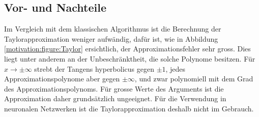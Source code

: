 \subsection{Vor- und Nachteile}
Im Vergleich mit dem klassischen Algorithmus ist die Berechnung der
Taylorapproximation weniger aufwändig, dafür ist, wie in Abbildung
\ref{motivation:figure:Taylor} ersichtlich, der Approximationsfehler
sehr gross. Dies liegt unter anderem an der Unbeschränktheit, die
solche Polynome besitzen.
Für $x\to\pm\infty$ strebt der Tangens hyperbolicus gegen $\pm 1$,
jedes Approximationspolynome aber gegen $\pm\infty$, und zwar polynomiell
mit dem Grad des Approximationspolynoms.
Für grosse Werte des Arguments ist die Approximation daher grundsätzlich
ungeeignet.
Für die Verwendung in neuronalen Netzwerken
ist die Taylorapproximation deshalb nicht im Gebrauch.
